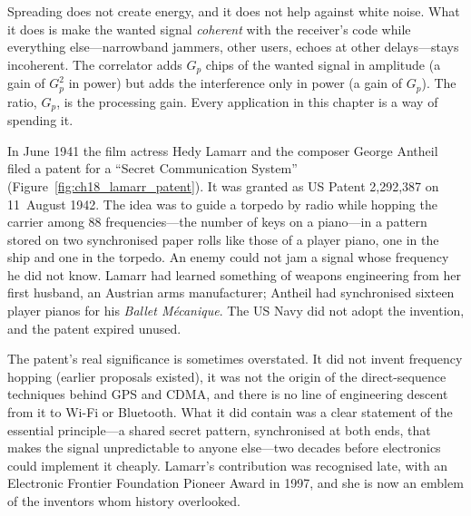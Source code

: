 
\begin{keyidea}
Spreading does not create energy, and it does not help against white noise. What it does
is make the wanted signal \emph{coherent} with the receiver's code while everything
else---narrowband jammers, other users, echoes at other delays---stays incoherent. The
correlator adds $G_p$ chips of the wanted signal in amplitude (a gain of $G_p^2$ in power)
but adds the interference only in power (a gain of $G_p$). The ratio, $G_p$, is the
processing gain. Every application in this chapter is a way of spending it.
\end{keyidea}


\begin{history}
In June 1941 the film actress Hedy Lamarr and the composer George Antheil filed a patent for a
``Secret Communication System'' (Figure~\ref{fig:ch18_lamarr_patent}). It was granted as US
Patent 2,292,387 on 11~August 1942. The idea was to guide a torpedo by radio while hopping the
carrier among 88 frequencies---the number of keys on a piano---in a pattern stored on two
synchronised paper rolls like those of a player piano, one in the ship and one in the torpedo. An
enemy could not jam a signal whose frequency he did not know. Lamarr had learned something of
weapons engineering from her first husband, an Austrian arms manufacturer; Antheil had
synchronised sixteen player pianos for his \emph{Ballet M\'ecanique}. The US Navy did not adopt
the invention, and the patent expired unused.

The patent's real significance is sometimes overstated. It did not invent frequency hopping
(earlier proposals existed), it was not the origin of the direct-sequence techniques behind
GPS and CDMA, and there is no line of engineering descent from it to Wi-Fi or Bluetooth. What
it did contain was a clear statement of the essential principle---a shared secret pattern,
synchronised at both ends, that makes the signal unpredictable to anyone else---two decades
before electronics could implement it cheaply. Lamarr's contribution was recognised late,
with an Electronic Frontier Foundation Pioneer Award in 1997, and she is now an emblem of the
inventors whom history overlooked.
\end{history}

